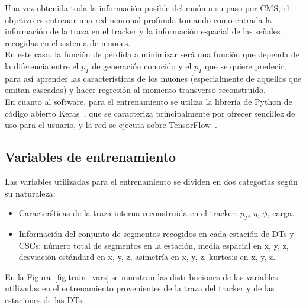 
Una vez obtenida toda la informaci\'on posible del mu\'on a su paso por CMS, el objetivo es entrenar una red neuronal profunda tomando como entrada la informaci\'on de la traza en el tracker y la informaci\'on espacial de las se\~nales recogidas en el sistema de muones. \\
En este caso, la funci\'on de p\'erdida a minimizar ser\'a una funci\'on que dependa de la diferencia entre el $p_{T}$ de generaci\'on conocido y el $p_{T}$ que se quiere predecir, para as\'i aprender las caracter\'isticas de los muones (especialmente de aquellos que emitan cascadas) y hacer regresi\'on al momento transverso reconstruido. \\

En cuanto al software, para el entrenamiento se utiliza la librer\'ia de Python de c\'odigo abierto Keras~\cite{chollet2015keras}, que se caracteriza principalmente por ofrecer sencillez de uso para el usuario, y la red se ejecuta sobre TensorFlow~\cite{tensorflow2015-whitepaper}.


\subsection{Variables de entrenamiento}\label{sec:variables}

Las variables utilizadas para el entrenamiento se dividen en dos categor\'ias seg\'un su naturaleza:

\begin{itemize}
\item Caracter\'sticas de la traza interna reconstruida en el tracker: $p_{T}$, $\eta$, $\phi$, carga.
\item Informaci\'on del conjunto de segmentos recogidos en cada estaci\'on de DTs y CSCs: n\'umero total de segmentos en la estaci\'on, media espacial en x, y, z, desviaci\'on est\'andard en x, y, z, asimetr\'ia en x, y, z, kurtosis en x, y, z.
\end{itemize}

En la Figura~\ref{fig:train_vars} se muestran las distribuciones de las variables utilizadas en el entrenamiento provenientes de la traza del tracker y de las estaciones de las DTs.

